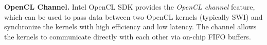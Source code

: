 {\bf OpenCL Channel. }
Intel OpenCL SDK provides the \emph{OpenCL channel} feature, which can be used to pass data between two OpenCL kernels (typically SWI) and synchronize the kernels with high efficiency and low latency. The channel allows the kernels to communicate directly with each other via on-chip FIFO buffers. %









